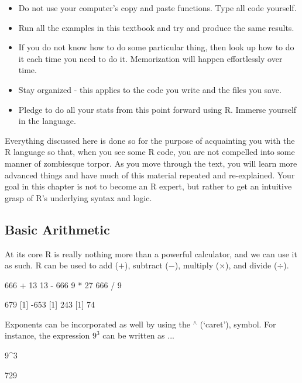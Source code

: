 \begin{itemize}
    \item Do not use your computer's copy and paste functions.  Type all code yourself.
    \item Run all the examples in this textbook and try and produce the same results.
    \item If you do not know how to do some particular thing, then look up how to do it each time you need to do it. Memorization will happen effortlessly over time.
    \item Stay organized - this applies to the code you write and the files you save.
    \item Pledge to do all your stats from this point forward using R. Immerse yourself in the language.
\end{itemize}

\noindent
Everything discussed here is done so for the purpose of acquainting you with the R language so that, when you see some R code, you are not compelled into some manner of zombiesque torpor.  As you move through the text, you will learn more advanced things and have much of this material repeated and re-explained.  Your goal in this chapter is not to become an R expert, but rather to get an intuitive grasp of R's underlying syntax and logic.


\subsection{Basic Arithmetic}

At its core R is really nothing more than a powerful calculator, and we can use it as such.  R can be used to add ($+$), subtract ($-$), multiply ($\times$), and divide ($\div$).

\begin{inR}
666 + 13
13 - 666
9 * 27
666 / 9
\end{inR}

\begin{outR}
[1] 679
[1] -653
[1] 243
[1] 74
\end{outR}

Exponents can be incorporated as well by using the $^\wedge$ (`caret'), symbol. For instance, the expression $9^3$ can be written as ...

\begin{inR}
9^3
\end{inR}

\begin{outR}
[1] 729
\end{outR}


